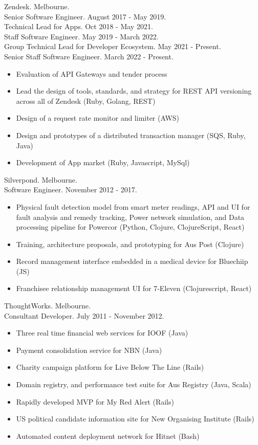 \documentclass[margin]{res}
\begin{document}
\begin{resume}
  Zendesk. Melbourne. \\
  Senior Software Engineer. August 2017 - May 2019. \\
  Technical Lead for Apps. Oct 2018 - May 2021. \\
  Staff Software Engineer. May 2019 - March 2022. \\
  Group Technical Lead for Developer Ecosystem. May 2021 - Present. \\
  Senior Staff Software Engineer. March 2022 - Present.
  \begin{itemize}
  \item Evaluation of API Gateways and tender process
  \item Lead the design of tools, standards, and strategy for REST API
    versioning across all of Zendesk (Ruby, Golang, REST)
  \item Design of a request rate monitor and limiter (AWS)
  \item Design and prototypes of a distributed transaction manager (SQS, Ruby,
    Java)
  \item Development of App market (Ruby, Javascript, MySql)
  \end{itemize}

  Silverpond. Melbourne. \\
  Software Engineer.  November 2012 - 2017.
  \begin{itemize}
  \item Physical fault detection model from smart meter readings, API and UI for
    fault analysis and remedy tracking, Power network simulation, and Data
    processing pipeline for Powercor (Python, Clojure, ClojureScript, React)
  \item Training, architecture proposals, and prototyping for Aus Post (Clojure)
  \item Record management interface embedded in a medical device for Bluechiip
    (JS)
  \item Franchisee relationship management UI for 7-Eleven (Clojurescript,
    React)
  \end{itemize} 

  ThoughtWorks. Melbourne. \\
  Consultant Developer.  July 2011 - November 2012.
  \begin{itemize}
  \item Three real time financial web services for IOOF (Java)
  \item Payment consolidation service for NBN (Java)
  \item Charity campaign platform for Live Below The Line (Rails)
  \item Domain registry, and performance test suite for Aus Registry (Java,
    Scala)
  \item Rapidly developed MVP for My Red Alert (Rails)
  \item US political candidate information site for New Organising Institute
    (Rails)
  \item Automated content deployment network for Hitnet (Bash)
  \end{itemize} 


\end{resume}
\end{document}
